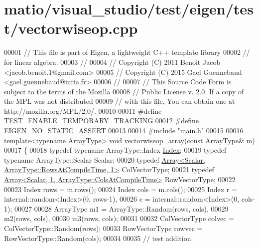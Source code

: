 \hypertarget{matio_2visual__studio_2test_2eigen_2test_2vectorwiseop_8cpp_source}{}\section{matio/visual\+\_\+studio/test/eigen/test/vectorwiseop.cpp}
\label{matio_2visual__studio_2test_2eigen_2test_2vectorwiseop_8cpp_source}

\begin{DoxyCode}
00001 \textcolor{comment}{// This file is part of Eigen, a lightweight C++ template library}
00002 \textcolor{comment}{// for linear algebra.}
00003 \textcolor{comment}{//}
00004 \textcolor{comment}{// Copyright (C) 2011 Benoit Jacob <jacob.benoit.1@gmail.com>}
00005 \textcolor{comment}{// Copyright (C) 2015 Gael Guennebaud <gael.guennebaud@inria.fr>}
00006 \textcolor{comment}{//}
00007 \textcolor{comment}{// This Source Code Form is subject to the terms of the Mozilla}
00008 \textcolor{comment}{// Public License v. 2.0. If a copy of the MPL was not distributed}
00009 \textcolor{comment}{// with this file, You can obtain one at http://mozilla.org/MPL/2.0/.}
00010 
00011 \textcolor{preprocessor}{#define TEST\_ENABLE\_TEMPORARY\_TRACKING}
00012 \textcolor{preprocessor}{#define EIGEN\_NO\_STATIC\_ASSERT}
00013 
00014 \textcolor{preprocessor}{#include "main.h"}
00015 
00016 \textcolor{keyword}{template}<\textcolor{keyword}{typename} ArrayType> \textcolor{keywordtype}{void} vectorwiseop\_array(\textcolor{keyword}{const} ArrayType& m)
00017 \{
00018   \textcolor{keyword}{typedef} \textcolor{keyword}{typename} ArrayType::Index \hyperlink{namespace_eigen_a62e77e0933482dafde8fe197d9a2cfde}{Index};
00019   \textcolor{keyword}{typedef} \textcolor{keyword}{typename} ArrayType::Scalar Scalar;
00020   \textcolor{keyword}{typedef} \hyperlink{group___core___module_class_eigen_1_1_array}{Array<Scalar, ArrayType::RowsAtCompileTime, 1>} 
      ColVectorType;
00021   \textcolor{keyword}{typedef} \hyperlink{group___core___module_class_eigen_1_1_array}{Array<Scalar, 1, ArrayType::ColsAtCompileTime>} 
      RowVectorType;
00022 
00023   Index rows = m.rows();
00024   Index cols = m.cols();
00025   Index r = internal::random<Index>(0, rows-1),
00026         c = internal::random<Index>(0, cols-1);
00027 
00028   ArrayType m1 = ArrayType::Random(rows, cols),
00029             m2(rows, cols),
00030             m3(rows, cols);
00031 
00032   ColVectorType colvec = ColVectorType::Random(rows);
00033   RowVectorType rowvec = RowVectorType::Random(cols);
00034 
00035   \textcolor{comment}{// test addition}

\end{DoxyCode}
